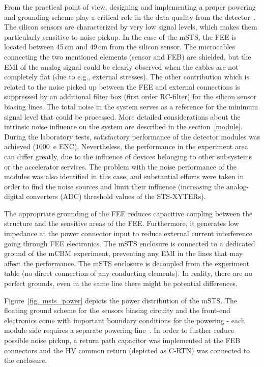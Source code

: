 From the practical point of view, designing and implementing a proper powering and grounding scheme play a critical role in the data quality from the detector~\cite{Bobillier:1159563}. The silicon sensors are characterized by very low signal levels, which makes them particularly sensitive to noise pickup. In the case of the \gls{mSTS}, the \gls{FEE} is located between 45\,cm and 49\,cm from the silicon sensor. The microcables connecting the two mentioned elements (sensor and \gls{FEB}) are shielded, but the \gls{EMI} of the analog signal could be clearly observed when the cables are not completely flat (due to e.g., external stresses).  The other contribution which is related to the noise picked up between the \gls{FEE} and external connections is suppressed by an additional filter box (first order RC-filter) for the silicon sensor biasing lines. The total noise in the system serves as a reference for the minimum signal level that could be processed. More detailed considerations about the intrinsic noise influence on the system are described in the section~\ref{module}. During the laboratory tests, satisfactory performance of the detector modules was achieved ($1000$~e \gls{ENC}). Nevertheless, the performance in the experiment area can differ greatly, due to the influence of devices belonging to other subsystems or the accelerator services. The problem with the noise performance of the modules was also identified in this case, and substantial efforts were taken in order to find the noise sources and limit their influence (increasing the analog-digital converters (\gls{ADC}) threshold values of the STS-XYTERs). 

The appropriate grounding of the \gls{FEE} reduces capacitive coupling between the structure and the sensitive areas of the \gls{FEE}. Furthermore, it generates low impedance at the power connector input to reduce external current interference going through FEE electronics. The \gls{mSTS} enclosure is connected to a dedicated ground of the \gls{mCBM} experiment, preventing any \gls{EMI} in the lines that may affect the performance. The \gls{mSTS} enclosure is decoupled from the experiment table (no direct connection of any conducting elements). In reality, there are no perfect grounds, even in the same line there might be potential differences. 

Figure~\ref{fig_msts_power} depicts the power distribution of the \gls{mSTS}. The floating ground scheme for the sensors biasing circuity and the front-end electronics come with important boundary conditions for the powering - each module side requires a separate powering line~\cite{RodriguezRodriguez2020}. In order to further reduce possible noise pickup, a return path capacitor was implemented at the \gls{FEB} connectors and the \gls{HV} common return (depicted as C-RTN) was connected to the enclosure.

